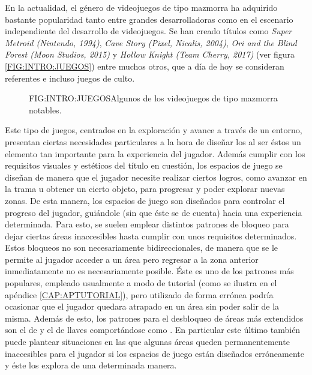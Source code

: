 En la actualidad, el género de videojuegos de tipo mazmorra ha adquirido bastante popularidad tanto entre grandes desarrolladoras como en el escenario independiente del desarrollo de videojuegos. Se han creado títulos como \textit{Super Metroid\cite{supermetroid} (Nintendo, 1994)}, \textit{Cave Story\cite{cavestory} (Pixel, Nicalis, 2004)}, \textit{Ori and the Blind Forest\cite{ori} (Moon Studios, 2015)} y \textit{Hollow Knight\cite{hollowknight} (Team Cherry, 2017)} (ver figura \ref{FIG:INTRO:JUEGOS}) entre muchos otros, que a día de hoy se consideran referentes e incluso juegos de culto.\newline
\begin{figure}{FIG:INTRO:JUEGOS}{Algunos de los videojuegos de tipo mazmorra notables.}
	 \quad
	 \quad
	 \quad
\end{figure}

Este tipo de juegos, centrados en la exploración y avance a través de un entorno, presentan ciertas necesidades particulares a la hora de diseñar los  al ser éstos un elemento tan importante para la experiencia del jugador.
Además cumplir con los requisitos visuales y estéticos del título en cuestión, los espacios de juego se diseñan de manera que el jugador necesite realizar ciertos logros, como avanzar en la trama u obtener un cierto objeto, para progresar y poder explorar nuevas zonas. De esta manera, los espacios de juego son diseñados para controlar el progreso del jugador, guiándole (sin que éste se de cuenta) hacia una experiencia determinada.\newline
Para esto, se suelen emplear distintos patrones de bloqueo para dejar ciertas áreas inaccesibles hasta cumplir con unos requisitos determinados.\newline
Estos bloqueos no son necesariamente bidireccionales, de manera que se le permite al jugador acceder a un área pero regresar a la zona anterior inmediatamente no es necesariamente posible. Éste es uno de los patrones más populares, empleado usualmente a modo de tutorial (como se ilustra en el apéndice \ref{CAP:APTUTORIAL}), pero utilizado de forma errónea podría ocasionar que el jugador quedara atrapado en un área sin poder salir de la misma.\newline
Además de esto, los patrones para el desbloqueo de áreas más extendidos son el de  y el de llaves comportándose como . En particular este último también puede plantear situaciones en las que algunas áreas queden permanentemente inaccesibles para el jugador si los espacios de juego están diseñados erróneamente y éste los explora de una determinada manera.\newline

